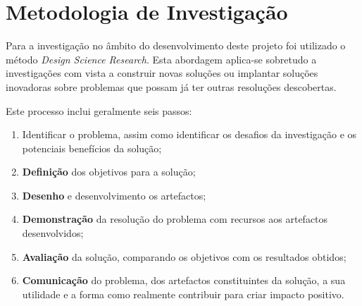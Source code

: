 \section{Metodologia de Investigação}
Para a investigação no âmbito do desenvolvimento deste projeto foi utilizado o método \emph{Design Science Research}. Esta abordagem aplica-se sobretudo a investigações com vista a construir novas soluções ou implantar soluções inovadoras sobre problemas que possam já ter outras resoluções descobertas\cite{design_science_research}.

Este processo inclui geralmente seis passos\cite{design_science_research}:
\begin{enumerate}
    \item Identificar o problema, assim como identificar os desafios da investigação e os potenciais benefícios da solução;
    \item \textbf{Definição} dos objetivos para a solução;
    \item \textbf{Desenho} e desenvolvimento os artefactos;
    \item \textbf{Demonstração} da resolução do problema com recursos aos artefactos desenvolvidos;
    \item \textbf{Avaliação} da solução, comparando os objetivos com os resultados obtidos;
    \item \textbf{Comunicação} do problema, dos artefactos constituintes da solução, a sua utilidade e a forma como realmente contribuir para criar impacto positivo.
\end{enumerate}


